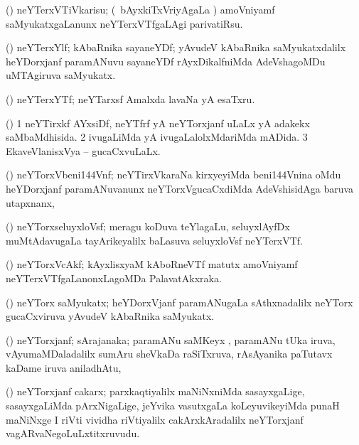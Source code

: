 \bentry
{}
\gl{\sakirx}
\bmng
(\ravi) neYTerxVTiVkarisu; (\kanmu\ bAyxkiTxVriyAgaLa \vi) amoVniyamf saMyukatxgaLanunx neYTerxVTfgaLAgi parivatiRsu. 
\emng
\eentry

\bentry
{}
\gl{\nA}
\bmng
(\ravi) neYTerxYlf; kAbaRnika sayaneYDf; yAvudeV kAbaRnika saMyukatxdalilx heYDorxjanf paramANuvu sayaneYDf  rAyxDikalfniMda AdeVshagoMDu uMTAgiruva saMyukatx. 
\emng
\eentry

\bentry
{}
\gl{\nA}
\bmng
(\ravi) neYTerxYTf; neYTarxsf Amalxda lavaNa yA esaTxru. 
\emng
\eentry

\bentry
{}
\gl{\sapUpa}
\bmng
(\ravi) 
\bnum
\num{1} neYTirxkf AYxsiDf, neYTfrf yA neYTorxjanf uLaLx yA adakekx saMbaMdhisida. 
\num{2} ivugaLiMda yA ivugaLalolxMdariMda mADida. 
\num{3} EkaveVlanisxVya --  gucaCxvuLaLx. 
\enum
\emng
\eentry

\bentry
{}
\gl{\nA}
\bmng
(\ravi) neYTorxVbeni\char144Vnf; neYTirxVkaraNa kirxyeyiMda beni\char144Vnina oMdu heYDorxjanf paramANuvanunx neYTorxVgucaCxdiMda AdeVshisidAga baruva utapxnanx,  
\emng
\eentry

\bentry
{}
\gl{\nA}
\bmng
(\ravi) neYTorxseluyxloVsf; meragu koDuva teYlagaLu, seluyxlAyfDx muMtAdavugaLa tayArikeyalilx baLasuva seluyxloVsf neYTerxVTf. 
\emng
\eentry

\bentry
{}
\gl{\nA}
\bmng
{}(\ravi) neYTorxVcAkf; kAyxlisxyaM kAboRneVTf matutx amoVniyamf neYTerxVTfgaLanonxLagoMDa PalavatAkxraka. 
\emng
\eentry

\bentry
{}
\gl{\nA}
\bmng
(\ravi) neYTorx saMyukatx; heYDorxVjanf paramANugaLa sAthxnadalilx neYTorx gucaCxviruva yAvudeV kAbaRnika saMyukatx. 
\emng
\eentry

\bentry
{}
\gl{\nA}
\bmng
(\ravi) neYTorxjanf; sArajanaka; paramANu saMKeyx , paramANu tUka  iruva, vAyumaMDaladalilx sumAru sheVkaDa raSiTxruva, rAsAyanika paTutavx kaDame iruva aniladhAtu, \saMkeV\  
\emng
\eentry

\bentry
{}
\gl{\nA}
\bmng
(\ravi) neYTorxjanf cakarx; parxkaqtiyalilx maNiNxniMda sasayxgaLige, sasayxgaLiMda pArxNigaLige, jeYvika vasutxgaLa koLeyuvikeyiMda punaH maNiNxge I riVti vividha riVtiyalilx cakArxkAradalilx neYTorxjanf vagARvaNegoLuLxtitxruvudu. 
\emng
\eentry

